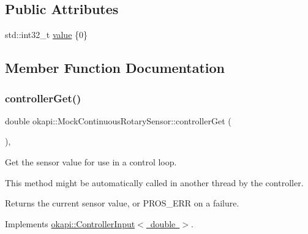 \subsection*{Public Attributes}
\begin{DoxyCompactItemize}
\item 
std\+::int32\+\_\+t \mbox{\hyperlink{classokapi_1_1MockContinuousRotarySensor_a7daf5e6388d826b904be99029f0c2e20}{value}} \{0\}
\end{DoxyCompactItemize}


\subsection{Member Function Documentation}
\mbox{\label{classokapi_1_1MockContinuousRotarySensor_acf954e463b18a377b1867fa66f89b319}} 
\subsubsection{\texorpdfstring{controllerGet()}{controllerGet()}}
{\footnotesize\ttfamily double okapi\+::\+Mock\+Continuous\+Rotary\+Sensor\+::controller\+Get (\begin{DoxyParamCaption}{ }\end{DoxyParamCaption})\hspace{0.3cm}{\ttfamily [override]}, {\ttfamily [virtual]}}



Get the sensor value for use in a control loop. 

This method might be automatically called in another thread by the controller.

\begin{DoxyReturn}{Returns}
the current sensor value, or {\ttfamily P\+R\+O\+S\+\_\+\+E\+RR} on a failure. 
\end{DoxyReturn}


Implements \mbox{\hyperlink{classokapi_1_1ControllerInput_a3c6c86d897983f367928a93890551e17}{okapi\+::\+Controller\+Input$<$ double $>$}}.

\mbox{\label{classokapi_1_1MockContinuousRotarySensor_a957dab6455bb40bf8bf848d521f3e207}} 
